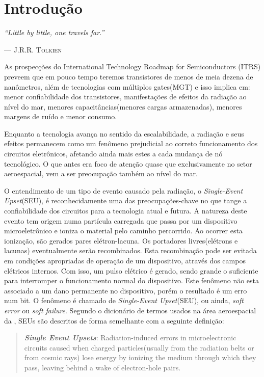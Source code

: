 \chapter{Introdução}

\epigraph{\sffamily\itshape
``Little by little, one travels far.''}{--- \textsc{J.R.R. Tolkien}}


As prospecções do International Technology Roadmap for Semiconductors (ITRS) preveem que em pouco tempo teremos transistores de menos de meia dezena de nanômetros, além de tecnologias com múltiplos gates(MGT) e isso implica em: menor confiabilidade dos transistores, manifestações de efeitos da radiação ao nível do mar, menores capacitâncias(menores cargas armazenadas), menores margens de ruído e menor consumo.\cite{Massengill2012}

Enquanto a tecnologia avança no sentido da escalabilidade, a radiação e seus efeitos permanecem como um fenômeno prejudicial ao correto funcionamento dos circuitos eletrônicos, afetando ainda mais estes a cada mudança de nó tecnológico. O que antes era foco de atenção quase que exclusivamente no setor aeroespacial, vem a ser preocupação também ao nível do mar.\cite{Massengill2012}

O entendimento de um tipo de evento causado pela radiação, o \textit{Single-Event Upset}(SEU), é reconhecidamente uma das preocupações-chave no que tange a confiabilidade dos circuitos para a tecnologia atual e futura. A natureza deste evento tem origem numa partícula carregada que passa por um dispositivo microeletrônico e ioniza o material pelo caminho percorrido. Ao ocorrer esta ionização, são gerados pares elétron-lacuna. Os portadores livres(elétrons e lacunas) eventualmente serão recombinados. Esta recombinação pode ser evitada em condições apropriadas de operação de um dispositivo, através dos campos elétricos internos. Com isso, um pulso elétrico é gerado, sendo grande o suficiente para interromper o funcionamento normal do dispositivo. Este fenômeno não esta associado a um dano permanente no dispositivo, porém o resultado é um erro num bit. O fenômeno é chamado de \textit{Single-Event Upset}(SEU), ou ainda, \textit{soft error} ou \textit{soft failure}\cite{Tang2003}. Segundo o dicionário de termos usados na área aeroespacial da , SEUs são descritos de forma semelhante com a seguinte definição:

\begin{quote}
\emph{\textbf{Single Event Upsets}}: Radiation-induced errors in microelectronic circuits caused when charged particles(usually from the radiation belts or from cosmic rays) lose energy by ionizing the medium through which they pass, leaving behind a wake of electron-hole pairs.
\end{quote}

